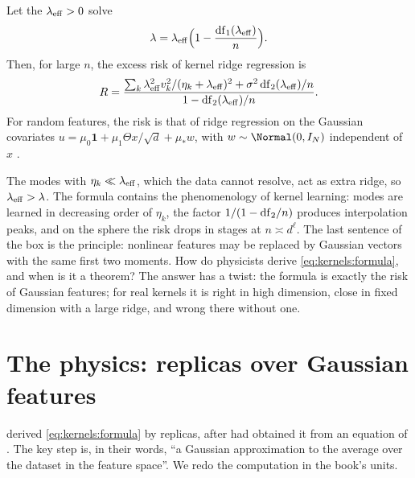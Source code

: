 \begin{refsection}
\begin{physicsbox}
Let the  $\lambda_{\mathrm{eff}}>0$ solve
\begin{equation}\label{eq:kernels:leff}
\lambda=\lambda_{\mathrm{eff}}\Bigl(1-\frac{\mathrm{df}_1(\lambda_{\mathrm{eff}})}n\Bigr).
\end{equation}
Then, for large $n$, the excess risk of kernel ridge regression is
\begin{equation}\label{eq:kernels:formula}
R=\frac{\sum_k\lambda_{\mathrm{eff}}^2v_k^2/(\eta_k+\lambda_{\mathrm{eff}})^2+\sigma^2\,\mathrm{df}_2(\lambda_{\mathrm{eff}})/n}{1-\mathrm{df}_2(\lambda_{\mathrm{eff}})/n}.
\end{equation}
For random features, the risk is that of ridge regression on the Gaussian covariates $u=\mu_0\mathbf 1+\mu_1\Theta x/\sqrt d+\mu_*w$, with $w\sim\Normal(0,I_N)$ independent of $x$ \parencite{GeraceEtAl2020,GoldtEtAl2020b}.
\end{physicsbox}

The modes with $\eta_k\ll\lambda_{\mathrm{eff}}$, which the data cannot resolve, act as extra ridge, so $\lambda_{\mathrm{eff}}>\lambda$. The formula contains the phenomenology of kernel learning: modes are learned in decreasing order of $\eta_k$, the factor $1/(1-\mathrm{df}_2/n)$ produces interpolation peaks, and on the sphere the risk drops in stages at $n\asymp d^\ell$. The last sentence of the box is the  principle: nonlinear features may be replaced by Gaussian vectors with the same first two moments. How do physicists derive \eqref{eq:kernels:formula}, and when is it a theorem? The answer has a twist: the formula is exactly the risk of Gaussian features; for real kernels it is right in high dimension, close in fixed dimension with a large ridge, and wrong there without one.

\section{The physics: replicas over Gaussian features}\label{sec:kernels:physics}

\Textcite{CanatarEtAl2021} derived \eqref{eq:kernels:formula} by replicas, after \textcite{BordelonEtAl2020} had obtained it from an equation of \textcite{Sollich1998}. The key step is, in their words, ``a Gaussian approximation to the average over the dataset in the feature space''. We redo the computation in the book's units.


\end{refsection}
